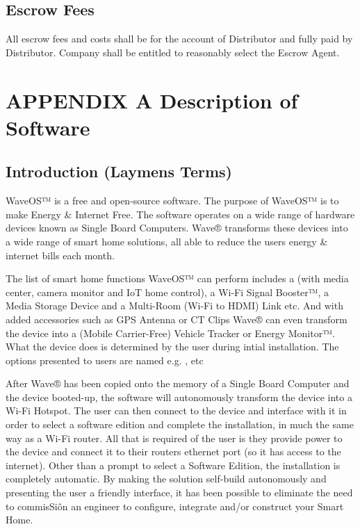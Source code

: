 \documentclass[letterpaper,10pt,english]{sphinxmanual}
\begin{document}
\section{Escrow Fees}
\label{\detokenize{escrow:escrow-fees}}
All escrow fees and costs shall be for the account of Distributor and fully paid by Distributor. Company shall be entitled to reasonably select the Escrow Agent.


\chapter{APPENDIX A \textendash{} Description of Software}
\label{\detokenize{appendix-a:appendix-a-description-of-software}}\label{\detokenize{appendix-a::doc}}


\section{Introduction (Laymens Terms)}
\label{\detokenize{appendix-a:introduction-laymens-terms}}
WaveOS™ is a free and open-source software. The purpose of WaveOS™ is to make Energy \& Internet Free. The software operates on a wide range of hardware devices known as Single Board Computers. Wave® transforms these devices into a wide range of smart home solutions, all able to reduce the users energy \& internet bills each month.

The list of smart home functions WaveOS™ can perform includes a  (with media center, camera monitor and IoT home control), a Wi-Fi Signal Booster™, a Media Storage Device and a Multi-Room (Wi-Fi to HDMI) Link etc. And with added accessories such as GPS Antenna or CT Clips Wave® can even transform the device into a (Mobile Carrier-Free) Vehicle Tracker or Energy Monitor™. What the device does is determined by the user during intial installation. The options presented to users are named  e.g. ,  etc

After Wave® has been copied onto the memory of a Single Board Computer and the device booted-up, the software will autonomously transform the device into a Wi-Fi Hotspot. The user can then connect to the device and interface with it in order to select a software edition and complete the installation, in much the same way as a Wi-Fi router. All that is required of the user is they provide power to the device and connect it to their routers ethernet port (so it has access to the internet). Other than a prompt to select a Software Edition, the installation is completely automatic. By making the solution self-build autonomously and presenting the user a friendly interface, it has been possible to eliminate the need to commisSiôn an engineer to configure, integrate and/or construct your Smart Home.
\end{document}
